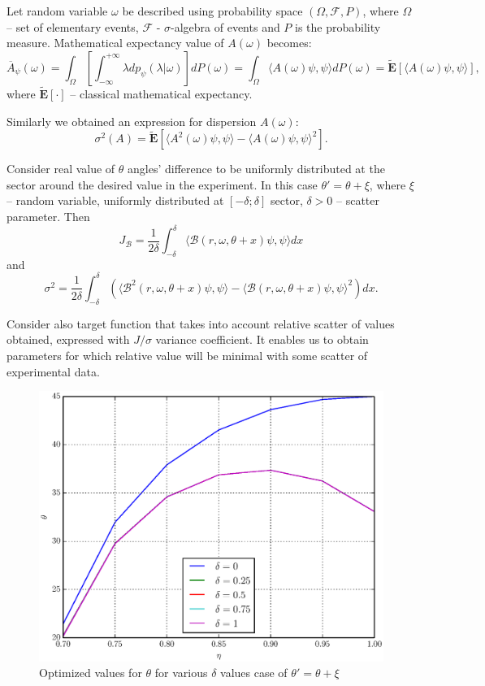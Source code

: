 \documentclass[11pt]{article}
\begin{document}
Let random variable $\omega$ be described using probability space $(\Omega, \mathcal{F}, P)$, 
where $\Omega$ -- set of elementary events, $\mathcal{F}$ - $\sigma$-algebra of events and 
$P$ is the probability measure. Mathematical expectancy value of $A(\omega)$ becomes:
\[
\overline{A}_\psi(\omega) = \int_\Omega\left[\int_{-\infty}^{+\infty}\lambda dp_\psi (\lambda|\omega)\right] dP(\omega) = \int_\Omega\langle A(\omega)\psi, \psi\rangle dP(\omega) = \mathbf{\tilde{E}}[ \langle A(\omega)\psi, \psi\rangle],
\]
where $\mathbf{\tilde{E}}[\cdot]$ -- classical mathematical expectancy.

Similarly we obtained an expression for dispersion $A(\omega)$:
\[
\sigma^2(A) = \mathbf{\tilde{E}}[ \langle A^2(\omega)\psi, \psi\rangle - \langle A(\omega)\psi, \psi\rangle^2].
\]

Consider real value of $\theta$ angles' difference to be uniformly distributed at the sector around 
the desired value in the experiment. In this case $\theta' = \theta + \xi$, where $\xi$ -- random variable, 
uniformly distributed at $[-\delta; \delta]$ sector, $\delta > 0$ -- scatter parameter. Then
\[
J_\mathcal{B} = \frac{1}{2\delta}\int_{-\delta}^\delta \langle \mathcal{B}(r, \omega, \theta + x)\psi, \psi \rangle dx
\] and
\[
\sigma^2 = \frac{1}{2\delta}\int_{-\delta}^\delta (\langle \mathcal{B}^2(r, \omega, \theta + x)\psi, \psi \rangle - \langle \mathcal{B}(r, \omega, \theta + x)\psi, \psi \rangle^2) dx.
\]

Consider also target function that takes into account relative scatter of values obtained, expressed with 
$J / \sigma$ variance coefficient. It enables us to obtain parameters for which  relative value will be minimal 
with some scatter of experimental data.

\begin{figure}[h]
\includegraphics[scale=0.7]{theta_ang.eps}
\caption{Optimized values for $\theta$ for various $\delta$ values case of $\theta' = \theta + \xi$}
\label{fig:theta_ang}
\end{figure}
\end{document}
